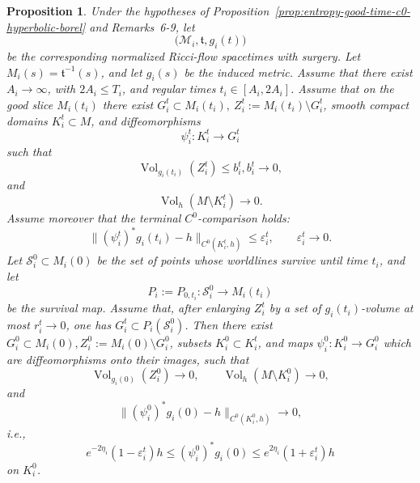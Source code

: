 \documentclass[10pt,a4paper]{amsart}
\newtheorem{proposition}{Proposition}
\begin{document}
\begin{proposition}
\label{prop:flowback-c0-comparison-map}
Under the hypotheses of Proposition~\ref{prop:entropy-good-time-c0-hyperbolic-borel} and
Remarks~6-9, let
\[
        \bigl(\mathcal M_i,\mathfrak t,g_i(t)\bigr)
\]
be the corresponding normalized Ricci-flow spacetimes with surgery.
Let \(M_i(s)=\mathfrak t^{-1}(s)\), and let \(g_i(s)\) be the induced metric.
Assume that there exist \(A_i\to\infty\), with \(2A_i\leq T_i\), and regular
times
$t_i\in[A_i,2A_i]$.
Assume that on the good slice \(M_i(t_i)\) there exist 
$G_i^t\subset M_i(t_i),~
        Z_i^t:=M_i(t_i)\setminus G_i^t$,
smooth compact domains \(K_i^t\subset M\), and diffeomorphisms
\[
        \psi_i^t:K_i^t\longrightarrow G_i^t
\]
such that
\[
        \operatorname{Vol}_{g_i(t_i)}(Z_i^t)\leq b_i^t,
        b_i^t\to0,
\]
and
\[
        \operatorname{Vol}_{h}(M\setminus K_i^t)\to0.
\]
Assume moreover that the terminal \(C^0\)-comparison holds:
\[
        \bigl\|(\psi_i^t)^*g_i(t_i)-h\bigr\|_{C^0(K_i^t,h)}
        \leq
        \varepsilon_i^t,
        \qquad
        \varepsilon_i^t\to0.
\]
Let \(\mathcal S_i^0\subset M_i(0)\) be the set of points whose worldlines
survive until time \(t_i\), and let
\[
        P_i:=P_{0,t_i}:\mathcal S_i^0\longrightarrow M_i(t_i)
\]
be the survival map. Assume that, after enlarging \(Z_i^t\) by a set of
\(g_i(t_i)\)-volume at most \(r_i^t\to0\), one has
$G_i^t\subset P_i(\mathcal S_i^0)$.
Then there exist
$G_i^0\subset M_i(0),        
        Z_i^0:=M_i(0)\setminus G_i^0$,
subsets \(K_i^0\subset K_i^t\), and maps
$\psi_i^0:K_i^0\longrightarrow G_i^0$
which are diffeomorphisms onto their images, such that
\[
        \operatorname{Vol}_{g_i(0)}(Z_i^0)\to0,
        \qquad
        \operatorname{Vol}_{h}(M\setminus K_i^0)\to0,
\]
and
\[
        \bigl\|(\psi_i^0)^*g_i(0)-h\bigr\|_{C^0(K_i^0,h)}
        \to0,
\]
i.e.,
\[
        e^{-2\eta_i}(1-\varepsilon_i^t)h
        \leq
        (\psi_i^0)^*g_i(0)
        \leq
        e^{2\eta_i}(1+\varepsilon_i^t)h
\]
on \(K_i^0\).
\end{proposition}
\end{document}
